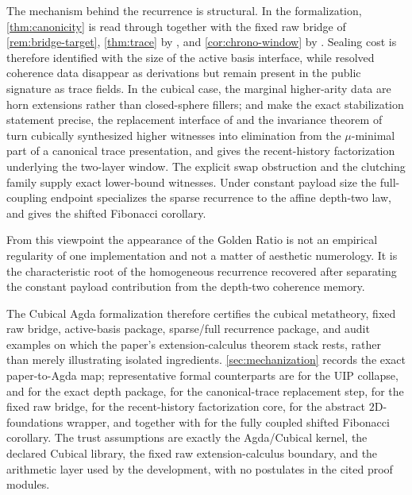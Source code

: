 \documentclass{lmcs}
\begin{document}
The mechanism behind the recurrence is structural. In the formalization, \autoref{thm:canonicity} is read through  together with the fixed raw bridge of \autoref{rem:bridge-target}, \autoref{thm:trace} by , and \autoref{cor:chrono-window} by . Sealing cost is therefore identified with the size of the active basis interface, while resolved coherence data disappear as derivations but remain present in the public signature as trace fields. In the cubical case, the marginal higher-arity data are horn extensions rather than closed-sphere fillers;  and  make the exact stabilization statement precise, the replacement interface of  and the  invariance theorem of  turn cubically synthesized higher witnesses into elimination from the $\mu$-minimal part of a canonical trace presentation, and  gives the recent-history factorization underlying the two-layer window. The explicit swap obstruction and the clutching family supply exact lower-bound witnesses. Under constant payload size the full-coupling endpoint  specializes the sparse recurrence to the affine depth-two law, and  gives the shifted Fibonacci corollary.

From this viewpoint the appearance of the Golden Ratio is not an empirical regularity of one implementation and not a matter of aesthetic numerology. It is the characteristic root of the homogeneous recurrence recovered after separating the constant payload contribution from the depth-two coherence memory.

The Cubical Agda formalization therefore certifies the cubical metatheory, fixed raw bridge, active-basis package, sparse/full recurrence package, and audit examples on which the paper's extension-calculus theorem stack rests, rather than merely illustrating isolated ingredients. \autoref{sec:mechanization} records the exact paper-to-Agda map; representative formal counterparts are  for the UIP collapse,  and  for the exact depth package,  for the canonical-trace replacement step,  for the fixed raw bridge,  for the recent-history factorization core,  for the abstract $2$D-foundations wrapper, and  together with  for the fully coupled shifted Fibonacci corollary. The trust assumptions are exactly the Agda/Cubical kernel, the declared Cubical library, the fixed raw extension-calculus boundary, and the arithmetic layer used by the development, with no postulates in the cited proof modules.



\end{document}
